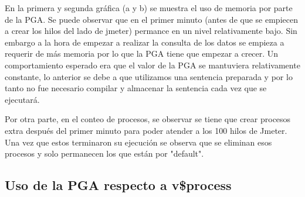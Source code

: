 \documentclass{article}
\begin{document}
En la primera y segunda gráfica (a y b) se muestra el uso de memoria por parte
de la PGA. Se puede observar que en el primer minuto (antes de que se empiecen a
crear los hilos del lado de jmeter) permance en un nivel relativamente bajo. Sin
embargo a la hora de empezar a realizar la consulta de los datos se empieza a
requerir de más memoria por lo que la PGA tiene que empezar a crecer. Un
comportamiento esperado era que el valor de la PGA se mantuviera relativamente 
constante, lo anterior se debe a que utilizamos una sentencia preparada y por lo
tanto no fue necesario compilar y almacenar la sentencia cada vez que se
ejecutará. 

Por otra parte, en el conteo de procesos, se observar se tiene que crear
procesos extra después del primer minuto para poder atender a los 100 hilos de
Jmeter. Una vez que estos terminaron su ejecución se observa que se eliminan
esos procesos y solo permanecen los que están por "default".

\subsection*{Uso de la PGA respecto a v\$process}
\end{document}

